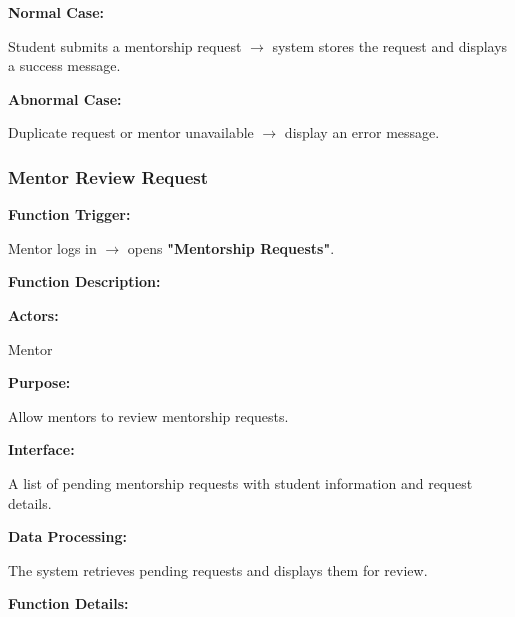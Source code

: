 \textbf{Normal Case:}

Student submits a mentorship request $\rightarrow$ system stores the request and displays a success message.

\textbf{Abnormal Case:}

Duplicate request or mentor unavailable $\rightarrow$ display an error message.

%

\subsubsection{Mentor Review Request}

\textbf{Function Trigger:}

Mentor logs in $\rightarrow$ opens \textbf{"Mentorship Requests"}.

\vspace{0.3cm}

\textbf{Function Description:}

\textbf{Actors:}

Mentor

\vspace{0.2cm}

\textbf{Purpose:}

Allow mentors to review mentorship requests.

\vspace{0.2cm}

\textbf{Interface:}

A list of pending mentorship requests with student information and request details.

\vspace{0.2cm}

\textbf{Data Processing:}

The system retrieves pending requests and displays them for review.

\vspace{0.3cm}

\textbf{Function Details:}

